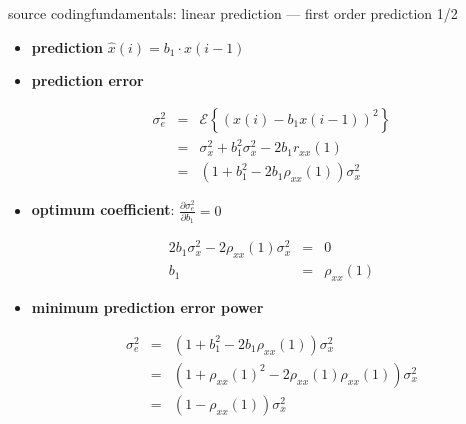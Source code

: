 	\begin{frame}{source coding}{fundamentals: linear prediction --- first order prediction 1/2}
        \vspace{-4mm}
        \begin{itemize}
            \item   \textbf{prediction}
                $\hat{x}(i) = b_1\cdot x(i-1)$
            \item<2->   \textbf{prediction error}
                \begin{footnotesize}
				\begin{eqnarray*}
                    \sigma_e^2 &=& \mathcal{E}\left\lbrace (x(i)-b_1x(i-1))^2\right\rbrace\\
                    &=& \sigma_x^2 + b_1^2 \sigma_x^2 -2b_1 r_{xx}(1)\\
                    &=& \left(1 + b_1^2 - 2b_1\rho_{xx}(1)\right) \sigma_x^2
				\end{eqnarray*}
                \end{footnotesize}
            \item<3->   \textbf{optimum coefficient}: $\frac{\partial\sigma_e^2}{\partial b_1} = 0$
                \begin{footnotesize}
				\begin{eqnarray*}
                    2b_1\sigma_x^2 - 2\rho_{xx}(1)\sigma_x^2 &=& 0\\
                    b_1 &=& \rho_{xx}(1)
				\end{eqnarray*}
                \end{footnotesize}
                \vspace{-4mm}
            \item<4->   \textbf{minimum prediction error power}
                \begin{footnotesize}
				\begin{eqnarray*}
                    \sigma_e^2 &=& \left(1 + b_1^2 - 2b_1\rho_{xx}(1)\right) \sigma_x^2\\
                    &=& \left(1 + \rho_{xx}(1)^2 - 2\rho_{xx}(1)\rho_{xx}(1)\right) \sigma_x^2\\
                    &=& (1-\rho_{xx}(1))\sigma_x^2
				\end{eqnarray*}
                \end{footnotesize}
        \end{itemize}
	\end{frame}
